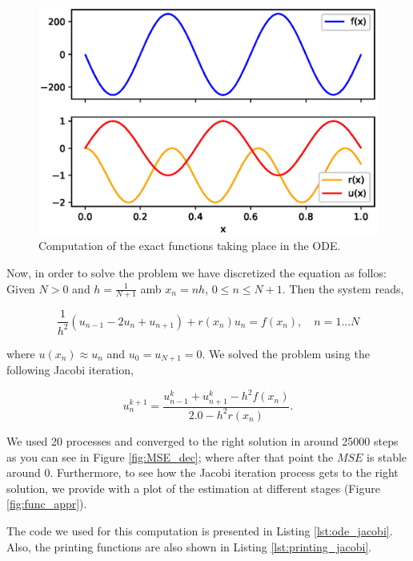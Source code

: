 \documentclass{article}
\begin{document}
\begin{enumerate}
\begin{figure}[H]
  \centering
  \includegraphics[scale=0.5]{prob_descr}
  \caption{Computation of the exact functions taking place in the ODE.}
  \label{fig:prob_descr}
\end{figure}

Now, in order to solve the problem we have discretized the equation as follos: Given $N>0$ and $h = \frac{1}{N+1}$ amb $x_n = nh$, $0 \leq n \leq N+1$. Then the system reads,

\begin{equation}
\frac{1}{h^2} (u_{n-1}-2u_n+u_{n+1})+r(x_n)u_n = f(x_n), \quad n = 1 ... N
\end{equation}

where $u(x_n) \approx u_n$ and $u_0 = u_{N+1} = 0$. We solved the problem using the following Jacobi iteration,

\begin{equation}
	u_n^{k+1} = \frac{u_{n-1}^k + u_{n+1}^k - h^2 f(x_n)}{2.0 - h^2 r(x_n)}.
\end{equation}

We used 20 processes and converged to the right solution in around 25000 steps as you can see in Figure \ref{fig:MSE_dec}; where after that point the $MSE$ is stable around 0. Furthermore, to see how the Jacobi iteration process gets to the right solution, we provide with a plot of the estimation at different stages (Figure \ref{fig:func_appr}).

The code we used for this computation is presented in Listing \ref{lst:ode_jacobi}. Also, the printing functions are also shown in Listing \ref{lst:printing_jacobi}.


\end{enumerate}
\end{document}

